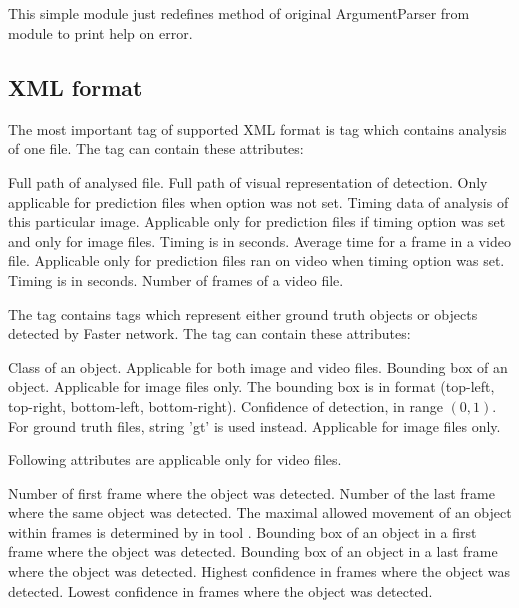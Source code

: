 \subsection{} \label{parse}
This simple module just redefines  method of original ArgumentParser from module  to print help on error.

\subsection{XML format}

The most important tag of supported XML format is tag  which contains analysis of one file. The tag  can contain these attributes:

\begin{description}
 Full path of analysed file.
 Full path of visual representation of detection. Only applicable for prediction files when option  was not set.
 Timing data of analysis of this particular image. Applicable only for prediction files if timing option  was set and only for image files. Timing is in seconds.
 Average time for a frame in a video file. Applicable only for prediction files ran on video when timing option  was set. Timing is in seconds.
 Number of frames of a video file.
\end{description}

The tag  contains tags  which represent either ground truth objects or objects detected by Faster \rcnn network. The tag  can contain these attributes:

\begin{description}
 Class of an object. Applicable for both image and video files.
 Bounding box of an object. Applicable for image files only. The bounding box is in format (top-left, top-right, bottom-left, bottom-right).
 Confidence of detection, in range $(0,1)$. For ground truth files, string 'gt' is used instead. Applicable for image files only.
\end{description}

Following attributes are applicable only for video files.
\begin{description}
 Number of first frame where the object was detected.
 Number of the last frame where the same object was detected. The maximal allowed movement of an object within frames is determined by  in tool \hyperref[rec]{}.
 Bounding box of an object in a first frame where the object was detected.
 Bounding box of an object in a last frame where the object was detected.
 Highest confidence in frames where the object was detected.
 Lowest confidence in frames where the object was detected.
\end{description}

